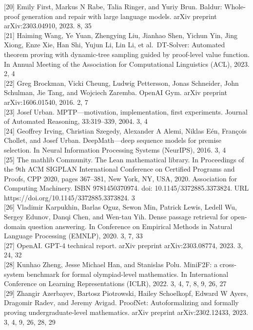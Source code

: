 \documentclass[
]{article}
\begin{document}
{[}20{]} Emily First, Markus N Rabe, Talia Ringer, and Yuriy Brun.
Baldur: Whole-proof generation and repair with large language models.
arXiv preprint arXiv:2303.04910, 2023. 8, 35\\
{[}21{]} Haiming Wang, Ye Yuan, Zhengying Liu, Jianhao Shen, Yichun Yin,
Jing Xiong, Enze Xie, Han Shi, Yujun Li, Lin Li, et al.~DT-Solver:
Automated theorem proving with dynamic-tree sampling guided by
proof-level value function. In Annual Meeting of the Association for
Computational Linguistics (ACL), 2023. 2, 4\\
{[}22{]} Greg Brockman, Vicki Cheung, Ludwig Pettersson, Jonas
Schneider, John Schulman, Jie Tang, and Wojciech Zaremba. OpenAI Gym.
arXiv preprint arXiv:1606.01540, 2016. 2, 7\\
{[}23{]} Josef Urban. MPTP---motivation, implementation, first
experiments. Journal of Automated Reasoning, 33:319--339, 2004. 3, 4\\
{[}24{]} Geoffrey Irving, Christian Szegedy, Alexander A Alemi, Niklas
Eén, François Chollet, and Josef Urban. DeepMath---deep sequence models
for premise selection. In Neural Information Processing Systems
(NeurIPS), 2016. 3, 4\\
{[}25{]} The mathlib Community. The Lean mathematical library. In
Proceedings of the 9th ACM SIGPLAN International Conference on Certified
Programs and Proofs, CPP 2020, pages 367--381, New York, NY, USA, 2020.
Association for Computing Machinery. ISBN 9781450370974. doi:
10.1145/3372885.3373824. URL https://doi.org/10.1145/3372885.3373824.
3\\
{[}26{]} Vladimir Karpukhin, Barlas Oguz, Sewon Min, Patrick Lewis,
Ledell Wu, Sergey Edunov, Danqi Chen, and Wen-tau Yih. Dense passage
retrieval for open-domain question answering. In Conference on Empirical
Methods in Natural Language Processing (EMNLP), 2020. 3, 7, 33\\
{[}27{]} OpenAI. GPT-4 technical report. arXiv preprint
arXiv:2303.08774, 2023. 3, 24, 32\\
{[}28{]} Kunhao Zheng, Jesse Michael Han, and Stanislas Polu. MiniF2F: a
cross-system benchmark for formal olympiad-level mathematics. In
International Conference on Learning Representations (ICLR), 2022. 3, 4,
7, 8, 9, 26, 27\\
{[}29{]} Zhangir Azerbayev, Bartosz Piotrowski, Hailey Schoelkopf,
Edward W Ayers, Dragomir Radev, and Jeremy Avigad. ProofNet:
Autoformalizing and formally proving undergraduate-level mathematics.
arXiv preprint arXiv:2302.12433, 2023. 3, 4, 9, 26, 28, 29\\
\end{document}
